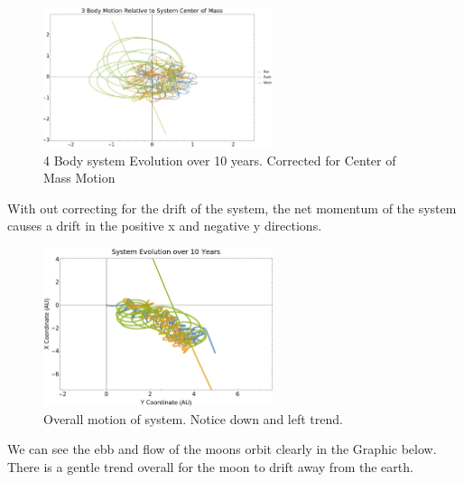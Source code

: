 \documentclass{article}
\begin{document}
\begin{figure}[!htb]
	\begin{center}
		\includegraphics[width=0.6\textwidth]{images/p2-1a.pdf}
	\end{center}
	\caption{4 Body system Evolution over 10 years. Corrected for Center of Mass Motion}
\label{fig:qual}
\end{figure}
\FloatBarrier

With out correcting for the drift of the system, the net momentum of the system causes a drift in the positive x and negative y directions.

\begin{figure}[!htb]
	\begin{center}
		\includegraphics[width=0.6\textwidth]{images/p2-1b.pdf}
	\end{center}
	\caption{Overall motion of system. Notice down and left trend.}
\label{fig:qual}
\end{figure}
\FloatBarrier

We can see the ebb and flow of the moons orbit clearly in the Graphic below. There is a gentle trend overall for the moon to drift away from the earth.
\end{document}

